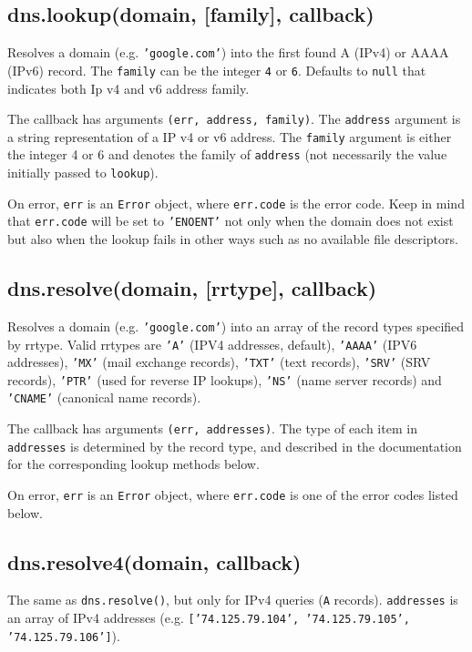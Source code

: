 \subsection{dns.lookup(domain, {[}family{]}, callback)}

Resolves a domain (e.g. \texttt{'google.com'}) into the first found A
(IPv4) or AAAA (IPv6) record. The \texttt{family} can be the integer
\texttt{4} or \texttt{6}. Defaults to \texttt{null} that indicates both
Ip v4 and v6 address family.

The callback has arguments \texttt{(err, address, family)}. The
\texttt{address} argument is a string representation of a IP v4 or v6
address. The \texttt{family} argument is either the integer 4 or 6 and
denotes the family of \texttt{address} (not necessarily the value
initially passed to \texttt{lookup}).

On error, \texttt{err} is an \texttt{Error} object, where
\texttt{err.code} is the error code. Keep in mind that \texttt{err.code}
will be set to \texttt{'ENOENT'} not only when the domain does not exist
but also when the lookup fails in other ways such as no available file
descriptors.

\subsection{dns.resolve(domain, {[}rrtype{]}, callback)}

Resolves a domain (e.g. \texttt{'google.com'}) into an array of the
record types specified by rrtype. Valid rrtypes are \texttt{'A'} (IPV4
addresses, default), \texttt{'AAAA'} (IPV6 addresses), \texttt{'MX'}
(mail exchange records), \texttt{'TXT'} (text records), \texttt{'SRV'}
(SRV records), \texttt{'PTR'} (used for reverse IP lookups),
\texttt{'NS'} (name server records) and \texttt{'CNAME'} (canonical name
records).

The callback has arguments \texttt{(err, addresses)}. The type of each
item in \texttt{addresses} is determined by the record type, and
described in the documentation for the corresponding lookup methods
below.

On error, \texttt{err} is an \texttt{Error} object, where
\texttt{err.code} is one of the error codes listed below.

\subsection{dns.resolve4(domain, callback)}

The same as \texttt{dns.resolve()}, but only for IPv4 queries
(\texttt{A} records). \texttt{addresses} is an array of IPv4 addresses
(e.g. \texttt{{[}'74.125.79.104', '74.125.79.105', '74.125.79.106'{]}}).

